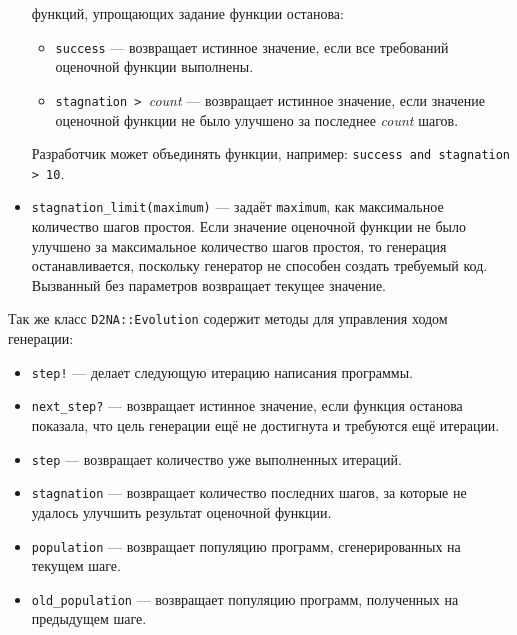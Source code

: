 \documentclass[utf8,a5paper,portrait,10pt,twoside]{eskdtext}
\begin{document}
\begin{itemize}
        функций, упрощающих задание функции останова:
        \begin{itemize}
          \item \texttt{success} — возвращает истинное значение, если все
                требований оценочной функции выполнены.
          \item \texttt{stagnation > }\textit{count} — возвращает истинное
                значение, если значение оценочной функции не было улучшено за
                последнее \textit{count} шагов.
        \end{itemize}
        Разработчик может объединять функции, например:
        \texttt{success and stagnation > 10}.
  \item \texttt{stagnation\_limit(maximum)} — задаёт \texttt{maximum}, как
        максимальное количество шагов простоя. Если значение оценочной функции
        не было улучшено за максимальное количество шагов простоя, то генерация
        останавливается, поскольку генератор не способен создать требуемый код.
        Вызванный без параметров возвращает текущее значение.
\end{itemize}

\newpage
Так же класс \texttt{D2NA::Evolution} содержит методы для управления ходом
генерации:
\begin{itemize}
  \item \texttt{step!} — делает следующую итерацию написания программы.
  \item \texttt{next\_step?} — возвращает истинное значение, если функция
        останова показала, что цель генерации ещё не достигнута и требуются ещё
        итерации.
  \item \texttt{step} — возвращает количество уже выполненных итераций.
  \item \texttt{stagnation} — возвращает количество последних шагов, за которые
        не удалось улучшить результат оценочной функции.
  \item \texttt{population} — возвращает популяцию программ, сгенерированных на
        текущем шаге.
  \item \texttt{old\_population} — возвращает популяцию программ, полученных на
        предыдущем шаге.
\end{itemize}
\end{document}
